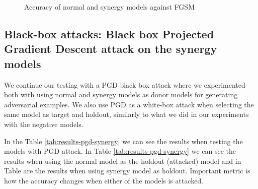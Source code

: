 \documentclass[b5paper]{book}
\begin{document}
\begin{figure}
    \centering
    \caption{Accuracy of normal and synergy models against FGSM}
    \label{fig:fgsm_chart_synergy}
\end{figure}

\subsection{Black-box attacks: Black box Projected Gradient Descent attack on the synergy models}

We continue our testing with a PGD black box attack where we experimented both with using normal and synergy models as donor models for generating adversarial examples. We also use PGD as a white-box attack when selecting the same model as target and holdout, similarly to what we did in our experiments with the negative models.

In the Table \ref{tab:results-pgd-synergy} we can see the results when testing the models with PGD attack. In Table \ref{tab:results-pgd-synergy} we can see the results when using the normal model as the holdout (attacked) model and in Table are the results when using synergy model as holdout. Important metric is how the accuracy changes when either of the models is attacked.
\end{document}
